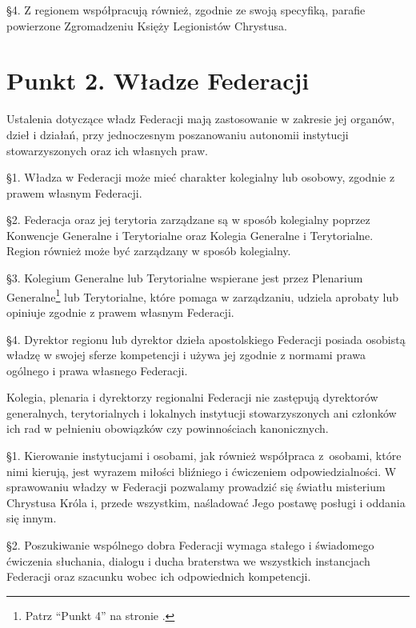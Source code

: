 \S{}4. Z regionem współpracują również, zgodnie ze swoją specyfiką, parafie powierzone Zgromadzeniu Księży Legionistów Chrystusa.


\section{Punkt 2. Władze Federacji}
 
 
 Ustalenia dotyczące władz Federacji mają zastosowanie w zakresie jej organów, dzieł i działań, przy jednoczesnym poszanowaniu autonomii instytucji stowarzyszonych oraz ich własnych praw.
 
 \S{}1. Władza w Federacji może mieć charakter kolegialny lub osobowy, zgodnie z prawem własnym Federacji.


\S{}2. Federacja oraz jej terytoria zarządzane są w sposób kolegialny poprzez Konwencje Generalne i Terytorialne oraz Kolegia Generalne i Terytorialne. Region również może być zarządzany w sposób kolegialny.


\S{}3. Kolegium Generalne lub Terytorialne wspierane jest przez Plenarium Generalne\footnote{Patrz “Punkt 4” na stronie \pageref{lbl-plenarium-generalne}.} lub Terytorialne, które pomaga w zarządzaniu, udziela aprobaty lub opiniuje zgodnie z prawem własnym Federacji.


\S{}4. Dyrektor regionu lub dyrektor dzieła apostolskiego Federacji posiada osobistą władzę w swojej sferze kompetencji i używa jej zgodnie z normami prawa ogólnego i prawa własnego Federacji.
 
 Kolegia, plenaria i dyrektorzy regionalni Federacji nie zastępują dyrektorów generalnych, terytorialnych i lokalnych instytucji stowarzyszonych ani członków ich rad w pełnieniu obowiązków czy powinnościach kanonicznych.
 
 
 \S{}1. Kierowanie instytucjami i osobami, jak również współpraca \mbox{z osobami}, które nimi kierują, jest wyrazem miłości bliźniego i ćwiczeniem odpowiedzialności. W sprawowaniu władzy w Federacji pozwalamy prowadzić się światłu misterium Chrystusa Króla i, przede wszystkim, naśladować Jego postawę posługi i oddania się innym.


\S{}2. Poszukiwanie wspólnego dobra Federacji wymaga stałego i świadomego ćwiczenia słuchania, dialogu i ducha braterstwa we wszystkich instancjach Federacji oraz szacunku wobec ich odpowiednich kompetencji.


